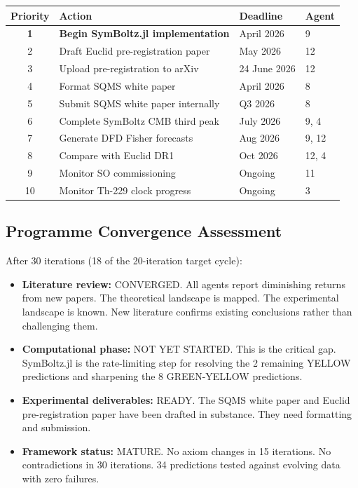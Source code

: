 \documentclass[11pt,a4paper]{article}
\begin{document}
\begin{center}
\begin{longtable}{clll}
\toprule
\textbf{Priority} & \textbf{Action} & \textbf{Deadline} & \textbf{Agent} \\
\midrule
\endfirsthead
\textbf{1} & \textbf{Begin SymBoltz.jl implementation} & April 2026 & 9 \\
2 & Draft Euclid pre-registration paper & May 2026 & 12 \\
3 & Upload pre-registration to arXiv & 24 June 2026 & 12 \\
4 & Format SQMS white paper & April 2026 & 8 \\
5 & Submit SQMS white paper internally & Q3 2026 & 8 \\
6 & Complete SymBoltz CMB third peak & July 2026 & 9, 4 \\
7 & Generate DFD Fisher forecasts & Aug 2026 & 9, 12 \\
8 & Compare with Euclid DR1 & Oct 2026 & 12, 4 \\
9 & Monitor SO commissioning & Ongoing & 11 \\
10 & Monitor Th-229 clock progress & Ongoing & 3 \\
\bottomrule
\end{longtable}
\end{center}

\subsection{Programme Convergence Assessment}

After 30 iterations (18 of the 20-iteration target cycle):

\begin{itemize}
\item \textbf{Literature review:} CONVERGED. All agents report diminishing returns from new papers. The theoretical landscape is mapped. The experimental landscape is known. New literature confirms existing conclusions rather than challenging them.

\item \textbf{Computational phase:} NOT YET STARTED. This is the critical gap. SymBoltz.jl is the rate-limiting step for resolving the 2 remaining YELLOW predictions and sharpening the 8 GREEN-YELLOW predictions.

\item \textbf{Experimental deliverables:} READY. The SQMS white paper and Euclid pre-registration paper have been drafted in substance. They need formatting and submission.

\item \textbf{Framework status:} MATURE. No axiom changes in 15 iterations. No contradictions in 30 iterations. 34 predictions tested against evolving data with zero failures.
\end{itemize}
\end{document}
